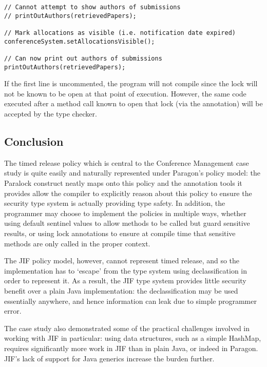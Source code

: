 \begin{verbatim}
// Cannot attempt to show authors of submissions
// printOutAuthors(retrievedPapers);

// Mark allocations as visible (i.e. notification date expired)
conferenceSystem.setAllocationsVisible();

// Can now print out authors of submissions
printOutAuthors(retrievedPapers);
\end{verbatim}

If the first  line is uncommented, the program will not compile since the lock will not be known to be open at that point of execution. However, the same code executed after a method call known to open that lock (via the  annotation) will be accepted by the type checker.

\subsection{Conclusion}

The timed release policy which is central to the Conference Management case study is quite easily and naturally represented under Paragon's policy model: the Paralock construct neatly maps onto this policy and the annotation tools it provides allow the compiler to explicitly reason about this policy to ensure the security type system is actually providing type safety. In addition, the programmer may choose to implement the policies in multiple ways, whether using default sentinel values to allow methods to be called but guard sensitive results, or using lock annotations to ensure at compile time that sensitive methods are only called in the proper context.

The JIF policy model, however, cannot represent timed release, and so the implementation has to `escape' from the type system using declassification in order to represent it. As a result, the JIF type system provides little security benefit over a plain Java implementation: the declassification may be used essentially anywhere, and hence information can leak due to simple programmer error.

The case study also demonstrated some of the practical challenges involved in working with JIF in particular: using data structures, such as a simple HashMap, requires significantly more work in JIF than in plain Java, or indeed in Paragon. JIF's lack of support for Java generics increase the burden further.